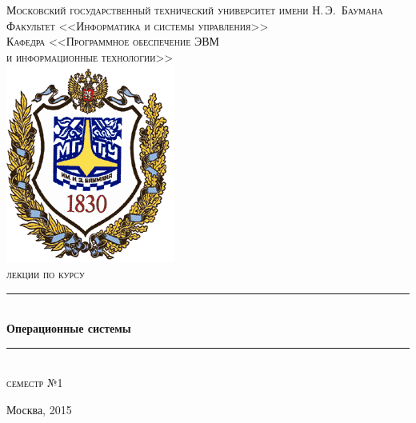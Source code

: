 \newcommand{\HRule}{\rule{\linewidth}{0.5mm}}

\begin{center}

\textsc{\large Московский государственный технический университет имени Н.\,Э.~Баумана}\\[0.5cm]
\textsc{Факультет <<Информатика и системы управления>>}\\
\textsc{Кафедра <<Программное обеспечение ЭВМ\\и информационные технологии>>}\\[0.25cm]

\includegraphics[scale=0.5]{assets/bmstu-logo.png}~\\[2.25cm]

\textsc{лекции по курсу}
\HRule \\[0.5cm]
{\huge \bfseries Операционные системы}
\HRule \\[0.5cm]
\textsc{\large семестр №1}\\

\vfill



{\large Москва, 2015}

\end{center}

\newpage
{}